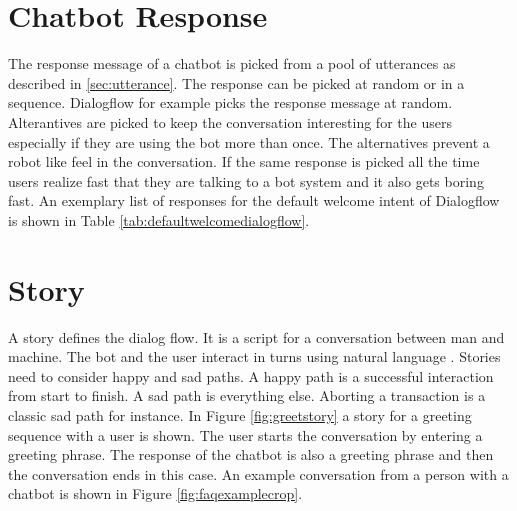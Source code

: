\section{Chatbot Response} \label{sec:chatbot_response}
The response message of a chatbot is picked from a pool of utterances as described in \ref{sec:utterance}.
The response can be picked at random or in a sequence.
Dialogflow for example picks the response message at random.
Alterantives are picked to keep the conversation interesting for the users especially
if they are using the bot more than once.
The alternatives prevent a robot like feel in the conversation. 
If the same response is picked all the time users realize fast that they are 
talking to a bot system and it also gets boring fast. 
An exemplary list of responses for the default welcome intent of Dialogflow is shown in Table \ref{tab:defaultwelcomedialogflow}.



\section{Story}
A story defines the dialog flow. 
It is a script for a conversation between man and machine.
The bot and the user interact in turns using natural language \cite{evaluateChatbotsShawar2007, shawar2007chatbots, huang2007extracting, gregori2017evaluation}.
Stories need to consider happy and sad paths. 
A happy path is a successful interaction from start to finish.
A sad path is everything else. Aborting a transaction is a classic sad path for instance. 
In Figure \ref{fig:greetstory} a story for a greeting sequence with a user is shown. 
The user starts the conversation by entering a greeting phrase. 
The response of the chatbot is also a greeting phrase and then the conversation ends in this case. 
An example conversation from a person with a chatbot is shown in Figure \ref{fig:faqexamplecrop}.

